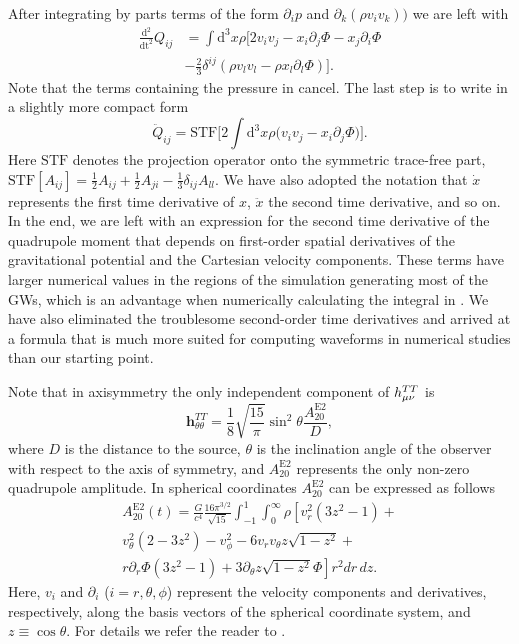 After integrating by parts terms of the form $\partial_i p$ and $\partial_k (\rho v_i v_k))$
we are left with
\begin{align} \label{eqT:quaddtt3}
\frac{\mathrm{d}^2}{\mathrm{dt}^2} Q_{ij} & = \int \mathrm{d}^3 x \rho \bigg[ 2 v_i v_j  - x_i \partial_j \Phi -  x_j \partial_i \Phi \nonumber \\
&- \frac{2}{3} \delta^{ij} (\rho v_l v_l - \rho x_l \partial_l \Phi)  \bigg]. 
\end{align}
Note that the terms containing the pressure in  cancel. The last step is to write  in a slightly more 
compact form    
\begin{equation} \label{eqT:STFQ}
\ddot{Q}_{ij} =\mathrm{STF} \bigg[2 \int \mathrm{d}^3 x \rho \Big( v_i v_j - x_i \partial_j \Phi \Big) \bigg].
\end{equation}
Here $\mathrm{STF}$ denotes the projection operator
onto the symmetric trace-free part, $\mathrm{STF}[A_{ij}] = \frac{1}{2}A_{ij} + \frac{1}{2}A_{ji} - \frac{1}{3} \delta_{ij} A_{ll} $.
We have also adopted the notation that $\dot{x}$ represents the first time derivative of $x$, $\ddot{x}$ the second time derivative, 
and so on.
In the end, we are left with an expression for the second time derivative of the quadrupole moment that
depends on first-order spatial derivatives of the gravitational potential and the Cartesian velocity components.
These terms have larger numerical values in the regions of the simulation generating most of the GWs, which is an advantage when numerically calculating the integral in . We have also 
eliminated the troublesome second-order time derivatives and arrived at a formula that is much more suited for 
computing waveforms in numerical studies than our starting point.

Note that in axisymmetry the only independent component of $h_{\mu\nu}^{TT}$ is 
\begin{equation} \label{eqt:hthth}
\mathbf{h}^{TT}_{\theta \theta} = \frac{1}{8}\sqrt{\frac{15}{\pi}} \sin^2{\theta} \frac{A_{20}^\mathrm{E2}}{D},
\end{equation}
where $D$ is the distance to the source, $\theta$ is the inclination angle of the observer with respect to the
axis of symmetry, and $A_{20}^\mathrm{E2}$ represents the only non-zero quadrupole amplitude.
In spherical coordinates $A_{20}^\mathrm{E2}$ can be expressed as follows
\begin{eqnarray} \label{eq:2dquad}
A_{20}^\mathrm{E2} (t) =  \frac{G}{c^4} \frac{16 \pi^{3/2}}{\sqrt{15}} \int_{-1}^{1}\int^{\infty}_0 \rho \left [ v_r^2(3 z^2 - 1)+ \right. \nonumber \\
v_{\theta}^2(2-3 z^2) - v_{\phi}^2 - 6 v_r v_{\theta} z\sqrt{1-z^2} + \nonumber \\
r \partial_r \Phi (3 z^2 - 1) +\left. 3 \partial_{\theta}z\sqrt{1-z^2} \Phi \right ]r^2 dr \, dz.
\end{eqnarray}
Here, $v_i$ and $\partial_i$ ($i = r, \theta, \phi$) represent the velocity components and derivatives, respectively, along
the basis vectors of the spherical coordinate system, and $z \equiv \cos \theta$.
For details we refer the reader to \cite{mueller_97}.

